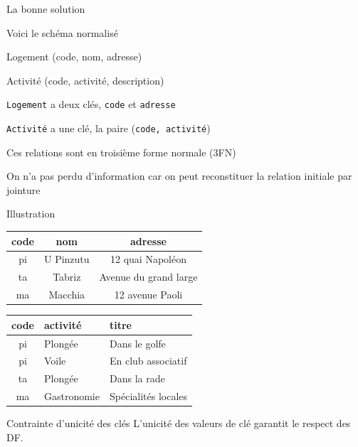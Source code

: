 \begin{frame}{La bonne solution}
 
Voici le schéma \alert{normalisé} 
\vfill

\begin{redbullet}
  \item Logement (code, nom, adresse)
 \item Activité (code, activité, description)
\end{redbullet}

\vfill
\texttt{Logement} a deux clés, \texttt{code} et \texttt{adresse}

\vfill
\texttt{Activité} a une  clé, la paire  (\texttt{code, activité})

\vfill


\begin{redbullet}
  \item Ces relations sont  en troisième forme normale (3FN)
 \item On n'a pas perdu d'information car on peut reconstituer la relation initiale par jointure
\end{redbullet}

\end{frame}


\begin{frame}{Illustration}
 
\begin{tabular}{c|c|c}
\textbf{code} & \textbf{nom} & \textbf{adresse}\\ \hline
   pi & U Pinzutu &12 quai Napoléon\\
   ta & Tabriz  &Avenue du grand large\\
   ma & Macchia  &12 avenue Paoli\\
\hline
\end{tabular}

\vfill

\begin{tabular}{c|l|p{4cm}}
\textbf{code} & \textbf{activité} & \textbf{titre}\\ \hline
   pi& Plongée &  Dans le golfe\\
   pi & Voile&  En club associatif\\
   ta & Plongée&  Dans la rade\\
   ma & Gastronomie&  Spécialités locales\\
\hline
\end{tabular}

\vfill
\begin{defblock}{Contrainte d'unicité des clés}
L'unicité des valeurs de clé garantit le respect des DF.
\end{defblock}
\end{frame}

